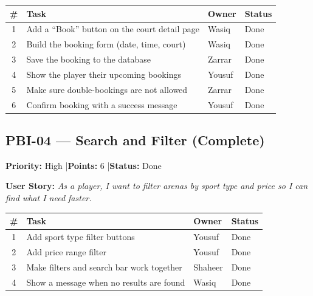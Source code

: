 \documentclass[12pt,a4paper]{article}
\begin{document}
\vspace{0.5em}
\noindent\renewcommand{\arraystretch}{1.3}
\begin{tabularx}{\textwidth}{|c|X|l|l|}
\hline
\rowcolor{headerbg}\color{white}\bfseries \# & \color{white}\bfseries Task & \color{white}\bfseries Owner & \color{white}\bfseries Status \\ \hline
1 & Add a ``Book'' button on the court detail page & Wasiq & Done \\ \hline
\rowcolor{rowgray} 2 & Build the booking form (date, time, court) & Wasiq & Done \\ \hline
3 & Save the booking to the database & Zarrar & Done \\ \hline
\rowcolor{rowgray} 4 & Show the player their upcoming bookings & Yousuf & Done \\ \hline
5 & Make sure double-bookings are not allowed & Zarrar & Done \\ \hline
\rowcolor{rowgray} 6 & Confirm booking with a success message & Yousuf & Done \\ \hline
\end{tabularx}

\newpage

\subsection*{PBI-04 --- Search and Filter (Complete)}
\textbf{Priority:} High \quad|\quad \textbf{Points:} 6 \quad|\quad \textbf{Status:} Done

\vspace{0.3em}
\textbf{User Story:} \textit{As a player, I want to filter arenas by sport type and price so I can find what I need faster.}

\vspace{0.5em}
\noindent\renewcommand{\arraystretch}{1.3}
\begin{tabularx}{\textwidth}{|c|X|l|l|}
\hline
\rowcolor{headerbg}\color{white}\bfseries \# & \color{white}\bfseries Task & \color{white}\bfseries Owner & \color{white}\bfseries Status \\ \hline
1 & Add sport type filter buttons & Yousuf & Done \\ \hline
\rowcolor{rowgray} 2 & Add price range filter & Yousuf & Done \\ \hline
3 & Make filters and search bar work together & Shaheer & Done \\ \hline
\rowcolor{rowgray} 4 & Show a message when no results are found & Wasiq & Done \\ \hline
\end{tabularx}
\end{document}
